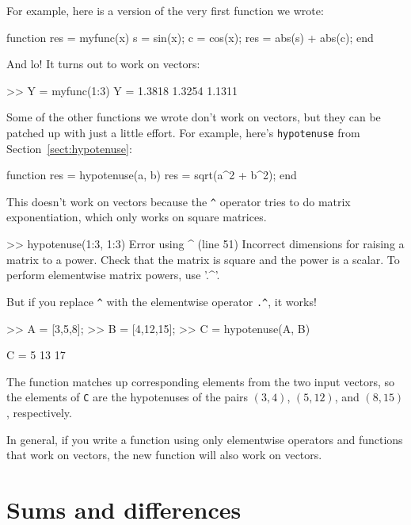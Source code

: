 \documentclass[
]{book}
\numberwithin{Answer}{chapter}
\numberwithin{Exercise}{chapter}
\begin{document}
For example, here is a version of the very first function we wrote:

\begin{code}
function res = myfunc(x)
    s = sin(x);
    c = cos(x);
    res = abs(s) + abs(c);
end
\end{code}

And lo!  It turns out to work on vectors:

\begin{code}
>> Y = myfunc(1:3)
Y = 1.3818    1.3254    1.1311
\end{code}

Some of the other functions we wrote don't work on vectors,
but they can be patched up with just a little effort.  For example,
here's {\tt hypotenuse} from Section~\ref{sect:hypotenuse}:

\begin{code}
function res = hypotenuse(a, b)
    res = sqrt(a^2 + b^2);
end
\end{code}

This doesn't work on vectors because the \verb+^+ operator
tries to do matrix exponentiation, which only works on
square matrices.

\begin{code}
>> hypotenuse(1:3, 1:3)
Error using  ^  (line 51)
Incorrect dimensions for raising a matrix to a power. 
Check that the matrix is square and the power is a scalar. 
To perform elementwise matrix powers, use '.^'.
\end{code}

But if you replace \verb+^+ with the elementwise operator
\verb+.^+, it works!

\begin{code}
>> A = [3,5,8];
>> B = [4,12,15];
>> C = hypotenuse(A, B)

C = 5    13    17
\end{code}

The function matches up corresponding elements from the two
input vectors, so the elements of {\tt C} are the hypotenuses of
the pairs $(3,4)$, $(5,12)$, and $(8,15)$, respectively.

In general, if you write a function using only elementwise
operators and functions that work on vectors, the new
function will also work on vectors.


\section{Sums and differences}
\end{document}
